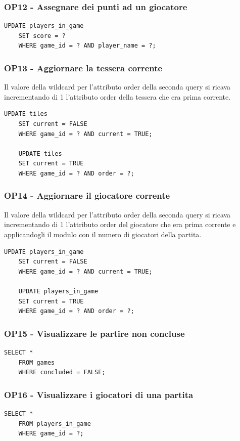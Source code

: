 \subsubsection*{OP12 - Assegnare dei punti ad un giocatore}
\begin{lstlisting}[style=sql]
    UPDATE players_in_game
    SET score = ?
    WHERE game_id = ? AND player_name = ?;
\end{lstlisting}

\subsubsection*{OP13 - Aggiornare la tessera corrente}
Il valore della wildcard per l'attributo order della seconda query si ricava incrementando di 1 l'attributo order della tessera che era prima corrente.
\medskip

\begin{lstlisting}[style=sql]
    UPDATE tiles
    SET current = FALSE
    WHERE game_id = ? AND current = TRUE;

    UPDATE tiles
    SET current = TRUE
    WHERE game_id = ? AND order = ?;
\end{lstlisting}

\subsubsection*{OP14 - Aggiornare il giocatore corrente}
Il valore della wildcard per l'attributo order della seconda query si ricava incrementando di 1 l'attributo order del giocatore che era prima corrente e applicandogli il modulo con il numero di giocatori della partita.
\medskip

\begin{lstlisting}[style=sql]
    UPDATE players_in_game
    SET current = FALSE
    WHERE game_id = ? AND current = TRUE;

    UPDATE players_in_game
    SET current = TRUE
    WHERE game_id = ? AND order = ?;
\end{lstlisting}

\subsubsection*{OP15 - Visualizzare le partire non concluse}
\begin{lstlisting}[style=sql]
    SELECT *
    FROM games
    WHERE concluded = FALSE;
\end{lstlisting}

\subsubsection*{OP16 - Visualizzare i giocatori di una partita}
\begin{lstlisting}[style=sql]
    SELECT *
    FROM players_in_game
    WHERE game_id = ?;
\end{lstlisting}


